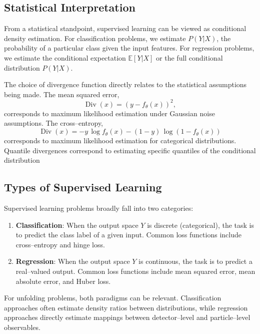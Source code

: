     \subsection{Statistical Interpretation}
    \label{subsec:supervised_learning.statistical_interpretation}
        From a statistical standpoint, supervised learning can be viewed as conditional density estimation.
        For classification problems, we estimate \(P(Y|X)\), the probability of a particular class given the input features.
        For regression problems, we estimate the conditional expectation \(\mathbb{E}[Y|X]\) or the full conditional distribution \(P(Y|X)\).

        The choice of divergence function directly relates to the statistical assumptions being made.
        The mean squared error, \[\operatorname{Div}(x) = (y - f_\theta(x))^2,\] corresponds to maximum likelihood estimation under Gaussian noise assumptions. The cross--entropy,
        \[
            \label{eq:bce}
            \operatorname{Div}(x) = -y\,\log f_\theta(x) - (1-y)\,\log(1 - f_\theta(x))
        \] corresponds to maximum likelihood estimation for categorical distributions.
        Quantile divergences correspond to estimating specific quantiles of the conditional distribution

    \subsection{Types of Supervised Learning}
        Supervised learning problems broadly fall into two categories:
        \begin{enumerate}
            \item \textbf{Classification}:
            When the output space \({Y}\) is discrete (categorical), the task is to predict the class label of a given input.
            Common loss functions include cross--entropy and hinge loss.
            \item \textbf{Regression}:
            When the output space \({Y}\) is continuous, the task is to predict a real--valued output.
            Common loss functions include mean squared error, mean absolute error, and Huber loss.
        \end{enumerate}
        For unfolding problems, both paradigms can be relevant.
        Classification approaches often estimate density ratios between distributions, while regression approaches directly estimate mappings between detector--level and particle--level observables.
